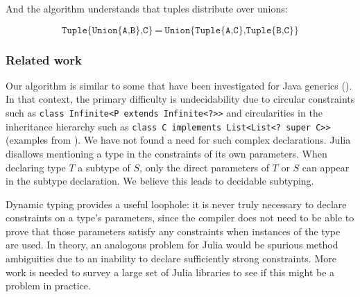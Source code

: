 \noindent
And the algorithm understands that tuples distribute over unions:

\vspace{-3ex}
\[
\texttt{Tuple\{Union\{A,B\},C\}}\ =\ \texttt{Union\{Tuple\{A,C\},Tuple\{B,C\}\}}
\]

\iffalse
\subsubsection{Pseudo-contravariance}

Bounded existential types are contravariant in their lower bounds.
However, the set denotations of our types give us that
$(\exists\ T>:X\ .\ T) = \texttt{Any}$.
By interposing an invariant constructor, we obtain a kind of contravariance:
\[
(\exists\ T>:X\ .\ \texttt{Ref}\{T\}) \leq (\exists\ T>:Y\ .\ \texttt{Ref}\{T\}) \implies Y\leq X
\]
This ability to ``flip'' types between sides of $\leq$ is one of the keys to
the undecidability of subtyping with bounded quantification~\cite{Pierce1994131}.
We conjecture that the presence of the invariant constructor blocks
undecidability in our case.
Types like this may be useful for describing nominal arrow types
(see section~\ref{sec:nominalarrows}).
\fi

\subsubsection{Related work}

Our algorithm is similar to some that have been investigated for Java
generics (\cite{wehr2008subtyping, Cameron:2009:SWE:1557898.1557902,
Tate:2011:TWJ:1993316.1993570}).
In that context, the primary difficulty is undecidability due to
circular constraints such as \texttt{class Infinite<P extends Infinite<?>>}
and circularities in the inheritance hierarchy such as
\texttt{class C implements List<List<?\ super C>>} (examples from
\cite{Tate:2011:TWJ:1993316.1993570}).
We have not found a need for such complex declarations.
Julia disallows mentioning a type in the constraints of its own parameters.
When declaring type $T$ a subtype of $S$, only the direct parameters of
$T$ or $S$ can appear in the subtype declaration.
We believe this leads to decidable subtyping.

Dynamic typing provides a useful loophole: it is never truly
necessary to declare constraints on a type's parameters, since
the compiler does not need to be able to prove that those
parameters satisfy any constraints when instances of the type are
used.
In theory, an analogous problem for Julia would be spurious method
ambiguities due to an inability to declare sufficiently strong
constraints.
More work is needed to survey a large set of Julia libraries to see
if this might be a problem in practice.

